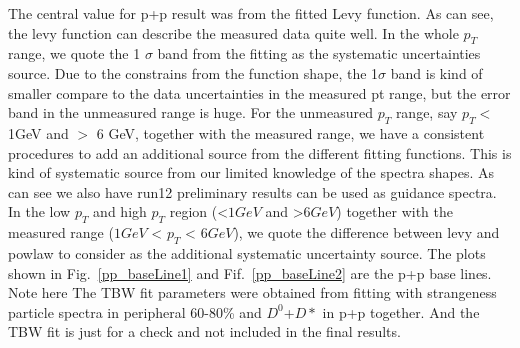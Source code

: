 
The central value for p+p result was from the fitted Levy function. As can see, the levy function can describe the measured data quite well. In the whole $p_T$ range, we quote the 1 $\sigma$ band from the fitting as the systematic uncertainties source. Due to the constrains from the function shape, the 1$\sigma$ band is kind of smaller compare to the data uncertainties in the measured pt range, but the error band in the unmeasured range is huge. For the unmeasured $p_T$ range, say $p_T <$ 1GeV and $>$ 6 GeV, together with the measured range, we have a consistent procedures to add an additional source from the different fitting functions. This is kind of systematic source from our limited knowledge of the spectra shapes. As can see we also have run12 preliminary results can be used as guidance spectra. In the low $p_T$ and high $p_T$ region (<$1 GeV$ and >$6 GeV$) together with the measured range ($ 1GeV$ < $p_{T}$ < $6 GeV$), we quote the difference between levy and powlaw to consider as the additional systematic uncertainty source. The plots shown in Fig.~\ref{pp_baseLine1} and Fif.~\ref{pp_baseLine2} are the p+p base lines. Note here The TBW fit parameters were obtained from fitting with strangeness particle spectra in peripheral 60-80\% and $D^0$+$D*$ in p+p together. And the TBW fit is just for a check and not included in the final results.

